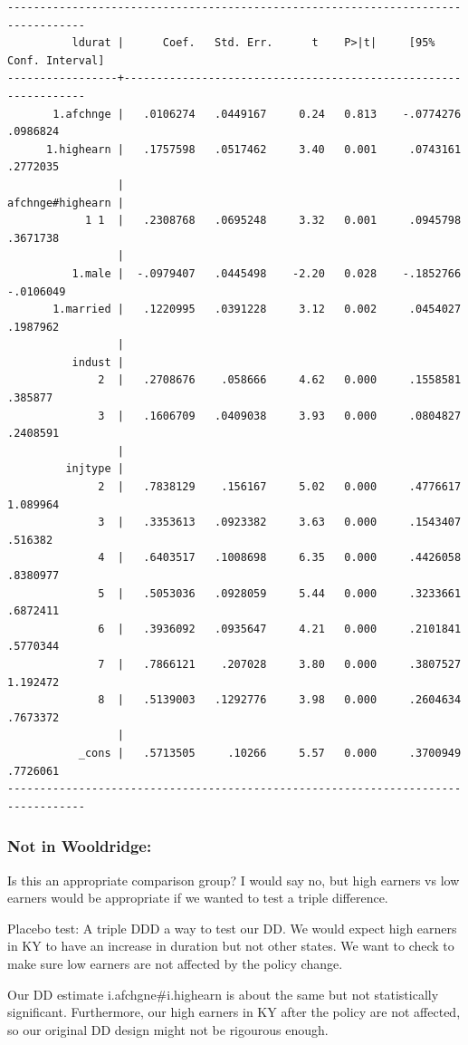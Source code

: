 \documentclass[
]{book}
\begin{document}
\begin{verbatim}
----------------------------------------------------------------------------------
          ldurat |      Coef.   Std. Err.      t    P>|t|     [95% Conf. Interval]
-----------------+----------------------------------------------------------------
       1.afchnge |   .0106274   .0449167     0.24   0.813    -.0774276    .0986824
      1.highearn |   .1757598   .0517462     3.40   0.001     .0743161    .2772035
                 |
afchnge#highearn |
            1 1  |   .2308768   .0695248     3.32   0.001     .0945798    .3671738
                 |
          1.male |  -.0979407   .0445498    -2.20   0.028    -.1852766   -.0106049
       1.married |   .1220995   .0391228     3.12   0.002     .0454027    .1987962
                 |
          indust |
              2  |   .2708676    .058666     4.62   0.000     .1558581     .385877
              3  |   .1606709   .0409038     3.93   0.000     .0804827    .2408591
                 |
         injtype |
              2  |   .7838129    .156167     5.02   0.000     .4776617    1.089964
              3  |   .3353613   .0923382     3.63   0.000     .1543407     .516382
              4  |   .6403517   .1008698     6.35   0.000     .4426058    .8380977
              5  |   .5053036   .0928059     5.44   0.000     .3233661    .6872411
              6  |   .3936092   .0935647     4.21   0.000     .2101841    .5770344
              7  |   .7866121    .207028     3.80   0.000     .3807527    1.192472
              8  |   .5139003   .1292776     3.98   0.000     .2604634    .7673372
                 |
           _cons |   .5713505     .10266     5.57   0.000     .3700949    .7726061
----------------------------------------------------------------------------------
\end{verbatim}

\subsubsection*{Not in Wooldridge:}\label{not-in-wooldridge}

Is this an appropriate comparison group? I would say no, but high earners vs low earners would be appropriate if we wanted to test a triple difference.

Placebo test: A triple DDD a way to test our DD. We would expect high earners in KY to have an increase in duration but not other states. We want to check to make sure low earners are not affected by the policy change.

Our DD estimate i.afchgne\#i.highearn is about the same but not statistically significant. Furthermore, our high earners in KY after the policy are not affected, so our original DD design might not be rigourous enough.
\end{document}
